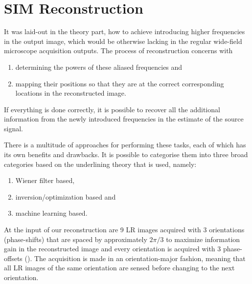 \setchapterpreamble[u]{\margintoc}
\chapter{\Ac{SIM} Reconstruction}


It was laid-out in the theory part, how to achieve introducing higher frequencies in the output image, which would be 
    otherwise lacking in the regular wide-field microscope acquisition outputs.
The process of reconstruction concerns with 
\begin{enumerate}[label=\roman*.]
    \item determining the powers of these aliased frequencies and 
    \item mapping their positions so that they are at the correct corresponding locations in the reconstructed image.
\end{enumerate}
If everything is done correctly, it is possible to recover all the additional information from the newly introduced 
    frequencies in the estimate of the source signal.

There is a multitude of approaches for performing these tasks, each of which has its own benefits and drawbacks.
It is possible to categorise them into three broad categories based on the underlining theory that is used, namely:
\begin{enumerate}[label=(\alph*)]
    \item Wiener filter based,
    \item inversion/optimization based and
    \item machine learning based.
\end{enumerate}

At the input of our reconstruction are 9 \acs{LR} images acquired with 3 orientations (phase-shifts) that are spaced by approximately \(2\pi/3\) to maximize 
    information gain in the reconstructed image and every orientation is acquired with 3 phase-offsets 
    ().
The acquisition is made in an orientation-major fashion, meaning that all \ac{LR} images of the same orientation are
    sensed before changing to the next orientation.

